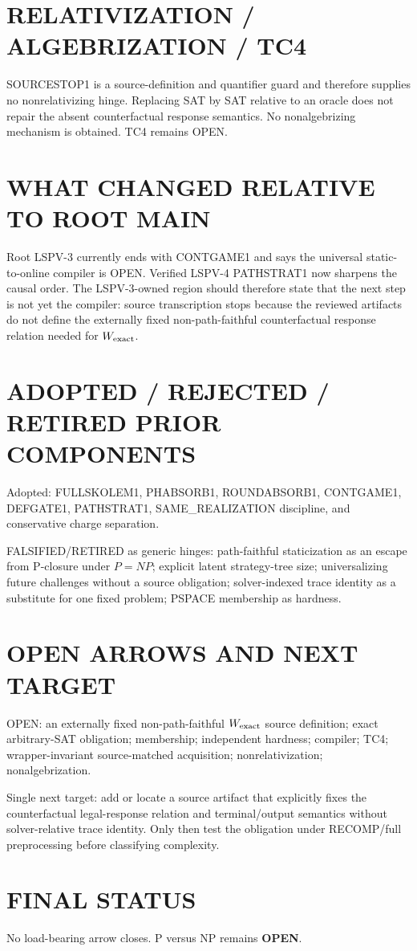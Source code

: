 \documentclass[11pt]{article}
\begin{document}
\section*{RELATIVIZATION / ALGEBRIZATION / TC4}
SOURCESTOP1 is a source-definition and quantifier guard and therefore supplies no nonrelativizing hinge. Replacing SAT by SAT relative to an oracle does not repair the absent counterfactual response semantics. No nonalgebrizing mechanism is obtained. TC4 remains OPEN.

\section*{WHAT CHANGED RELATIVE TO ROOT MAIN}
Root LSPV-3 currently ends with CONTGAME1 and says the universal static-to-online compiler is OPEN. Verified LSPV-4 PATHSTRAT1 now sharpens the causal order. The LSPV-3-owned region should therefore state that the next step is not yet the compiler: source transcription stops because the reviewed artifacts do not define the externally fixed non-path-faithful counterfactual response relation needed for $W_{\rm exact}$.

\section*{ADOPTED / REJECTED / RETIRED PRIOR COMPONENTS}
Adopted: FULLSKOLEM1, PHABSORB1, ROUNDABSORB1, CONTGAME1, DEFGATE1, PATHSTRAT1, SAME\_REALIZATION discipline, and conservative charge separation.

FALSIFIED/RETIRED as generic hinges: path-faithful staticization as an escape from P-closure under $P=NP$; explicit latent strategy-tree size; universalizing future challenges without a source obligation; solver-indexed trace identity as a substitute for one fixed problem; PSPACE membership as hardness.

\section*{OPEN ARROWS AND NEXT TARGET}
OPEN: an externally fixed non-path-faithful $W_{\rm exact}$ source definition; exact arbitrary-SAT obligation; membership; independent hardness; compiler; TC4; wrapper-invariant source-matched acquisition; nonrelativization; nonalgebrization.

Single next target: add or locate a source artifact that explicitly fixes the counterfactual legal-response relation and terminal/output semantics without solver-relative trace identity. Only then test the obligation under RECOMP/full preprocessing before classifying complexity.

\section*{FINAL STATUS}
No load-bearing arrow closes. P versus NP remains \textbf{OPEN}.

\end{document}
